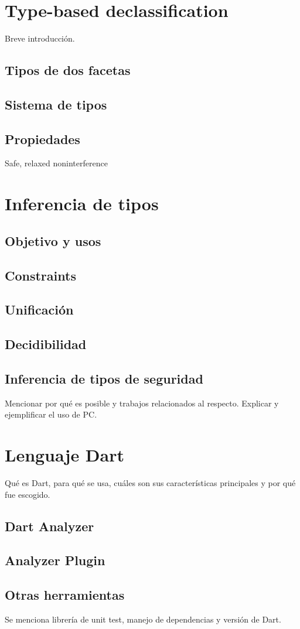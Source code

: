\section{Type-based declassification}
Breve introducción.
\subsection{Tipos de dos facetas}
\subsection{Sistema de tipos}
\subsection{Propiedades}
Safe, relaxed noninterference

\section{Inferencia de tipos}
\subsection{Objetivo y usos}
\subsection{Constraints}
\subsection{Unificación}
\subsection{Decidibilidad}

\subsection{Inferencia de tipos de seguridad}
Mencionar por qué es posible y trabajos relacionados al respecto. Explicar y ejemplificar el uso de PC.

\section{Lenguaje Dart}
Qué es Dart, para qué se usa, cuáles son sus características principales y por qué fue escogido.
\subsection{Dart Analyzer}
\subsection{Analyzer Plugin}
\subsection{Otras herramientas}
Se menciona librería de unit test, manejo de dependencias y versión de Dart.
